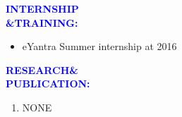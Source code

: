 \documentclass{article}
\begin{document}
\begin{flushleft}
	\textcolor{blue}{\textbf{INTERNSHIP\\\&TRAINING:}}
	\begin{itemize}
		\vspace{-0.29in}
		\addtolength{\itemindent}{1.0in}	
		\item eYantra Summer internship at 2016
	\end{itemize}
\end{flushleft}
\begin{flushleft}
	\textcolor{blue}{\textbf{RESEARCH\&\\\hspace{-0.05in}PUBLICATION:}}
	\begin{enumerate}
		\vspace{-0.29in}
		\addtolength{\itemindent}{1in}	
		\item NONE
	\end{enumerate}
\end{flushleft}
\end{document}
